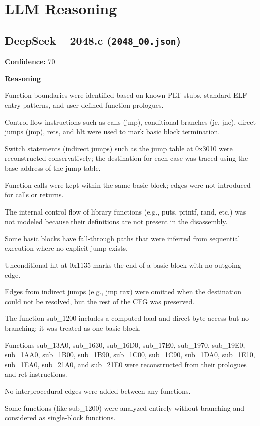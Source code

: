 \section{LLM Reasoning}
\label{appendix:llm_reasoning}

\subsection{DeepSeek -- 2048.c (\texttt{2048\_O0.json})}

\textbf{Confidence:} 70

\textbf{Reasoning}

Function boundaries were identified based on known PLT stubs, standard ELF entry patterns, and user-defined function prologues.

Control-flow instructions such as calls (jmp), conditional branches (je, jne), direct jumps (jmp), rets, and hlt were used to mark basic block termination.

Switch statements (indirect jumps) such as the jump table at 0x3010 were reconstructed conservatively; the destination for each case was traced using the base address of the jump table.

Function calls were kept within the same basic block; edges were not introduced for calls or returns.

The internal control flow of library functions (e.g., puts, printf, rand, etc.) was not modeled because their definitions are not present in the disassembly.

Some basic blocks have fall-through paths that were inferred from sequential execution where no explicit jump exists.

Unconditional hlt at 0x1135 marks the end of a basic block with no outgoing edge.

Edges from indirect jumps (e.g., jmp rax) were omitted when the destination could not be resolved, but the rest of the CFG was preserved.

The function sub\_1200 includes a computed load and direct byte access but no branching; it was treated as one basic block.

Functions sub\_13A0, sub\_1630, sub\_16D0, sub\_17E0, sub\_1970, sub\_19E0, sub\_1AA0, sub\_1B00, sub\_1B90, sub\_1C00, sub\_1C90, sub\_1DA0, sub\_1E10, sub\_1EA0, sub\_21A0, and sub\_21E0 were reconstructed from their prologues and ret instructions.

No interprocedural edges were added between any functions.

Some functions (like sub\_1200) were analyzed entirely without branching and considered as single-block functions.


